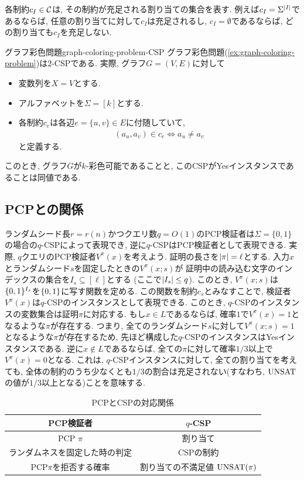 各制約$c_I\in \mathcal{C}$は, その制約が充足される割り当ての集合を表す.
例えば$c_I = \Sigma^{\abs{I}}$であるならば, 任意の割り当てに対して$c_I$は充足されるし,
$c_I = \emptyset$であるならば, どの割り当ても$c_I$を充足しない.

\begin{example}{グラフ彩色問題}{graph-coloring-problem-CSP}
  グラフ彩色問題(\cref{ex:graph-coloring-problem})は$2$-CSPである.
  実際, グラフ$G=(V,E)$に対して
  \begin{itemize}
    \item 変数列を$X=V$とする.
    \item アルファベットを$\Sigma=[k]$とする.
    \item 各制約$c_e$は各辺$e=\{u,v\}\in E$に付随していて,
    \begin{align*}
      (a_u,a_v) \in c_e \iff a_u\ne a_v
    \end{align*}
  と定義する.
  \end{itemize}
  このとき, グラフ$G$が$k$-彩色可能であることと, このCSPがYesインスタンスであることは同値である.
\end{example}




\subsection{PCPとの関係}
ランダムシード長$r=r(n)$かつクエリ数$q=O(1)$のPCP検証者は$\Sigma=\{0,1\}$の場合の$q$-CSPによって表現でき, 逆に$q$-CSPはPCP検証者として表現できる.
実際, $q$クエリのPCP検証者$V^\pi(x)$を考えよう.
証明の長さを$\abs{\pi}=\ell$とする.
入力$x$とランダムシード$s$を固定したときの$V^\pi(x;s)$が
証明中の読み込む文字のインデックスの集合を$I_s\subseteq[\ell]$とする (ここで$\abs{I_s}\le q$).
このとき, $V^\pi(x;s)$は$\{0,1\}^{I_s}$を$\{0,1\}$に写す関数を定める.
この関数を制約$c_s$とみなすことで, 検証者$V^\pi(x)$は$q$-CSPのインスタンスとして表現できる.
このとき, $q$-CSPのインスタンスの変数集合は証明$\pi$に対応する.
もし$x\in L$であるならば, 確率$1$で$V^\pi(x)=1$となるような$\pi$が存在する.
つまり, 全てのランダムシード$s$に対して$V^\pi(x;s)=1$となるような$\pi$が存在するため,
先ほど構成した$q$-CSPのインスタンスはYesインスタンスである.
逆に$x\not\in L$であるならば, 全ての$\pi$に対して確率$1/3$以上で$V^\pi(x)=0$となる.
これは, $q$-CSPインスタンスに対して, 全ての割り当てを考えても, 全体の制約のうち少なくとも$1/3$の割合は充足されない(すなわち, $\mathrm{UNSAT}$の値が$1/3$以上となる)ことを意味する.


\begin{table}[htbp]
  \centering
  \begin{tabular}{|c|c|}
    \hline
    PCP検証者 & $q$-CSP \\
    \hline
    PCP $\pi$ & 割り当て \\
    \hline
    ランダムネスを固定した時の判定 & CSPの制約 \\
    \hline
    PCP$\pi$を拒否する確率 & 割り当ての不満足値 $\mathrm{UNSAT}(\pi)$ \\
    \hline
  \end{tabular}
  \caption{PCPとCSPの対応関係}
  \label{table:pcp-csp-correspondence}
\end{table}

